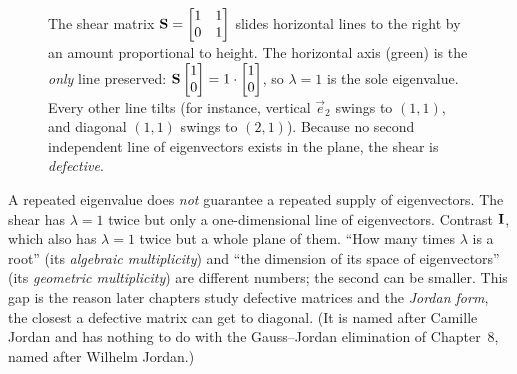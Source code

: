 \begin{figure}[H]
\centering
{}
\caption{The shear matrix $\mathbf{S}=\protect\begin{bmatrix}1&1\\0&1\protect\end{bmatrix}$
slides horizontal lines to the right by an amount proportional to height.
The horizontal axis (green) is the \emph{only} line preserved: $\mathbf{S}\begin{bmatrix}1\\0\end{bmatrix}=1\cdot\begin{bmatrix}1\\0\end{bmatrix}$,
so $\lambda=1$ is the sole eigenvalue. Every other line tilts (for instance, vertical $\vec{e}_2$ swings
to $(1,1)$, and diagonal $(1,1)$ swings to $(2,1)$).
Because no second independent line of eigenvectors exists in the plane, the shear is \emph{defective}.}
\label{ch23:fig-shear}
\end{figure}

\begin{trapbox}
A repeated eigenvalue does \emph{not} guarantee a repeated supply of eigenvectors.
The shear has $\lambda=1$ twice but only a one-dimensional line of eigenvectors.
Contrast $\mathbf{I}$, which also has $\lambda=1$ twice but a whole plane of them.
``How many times $\lambda$ is a root'' (its \emph{algebraic multiplicity}) and
``the dimension of its space of eigenvectors'' (its \emph{geometric multiplicity})
are different numbers; the second can be smaller. This gap is the reason later
chapters study defective matrices and the \emph{Jordan form}, the closest a
defective matrix can get to diagonal. (It is named after Camille Jordan and has nothing
to do with the Gauss--Jordan elimination of Chapter~8, named after Wilhelm Jordan.)
\end{trapbox}

